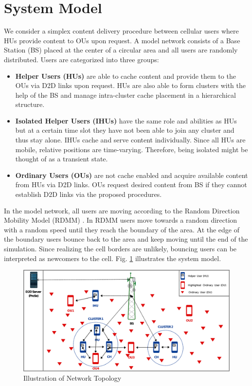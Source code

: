\documentclass[10pt,a4paper,twocolumn]{article}
\begin{document}
\section{System Model}
\label{sec:sec2}
We consider a simplex content delivery procedure between cellular users where HUs provide content to OUs upon request.  A model network consists of a Base Station (BS) placed at the center of a circular area and all users are randomly distributed. Users are categorized into three groups: 

\begin{itemize}
	\item \textbf{Helper Users (HUs)} are able to cache content and provide them to the OUs via D2D links upon request. HUs are also able to form clusters with the help of the BS and manage intra-cluster cache placement in a hierarchical structure.  
	
	\item \textbf{Isolated Helper Users (IHUs)} have the same role and abilities as HUs but at a certain time slot they have not been able to join any cluster and thus stay alone. IHUs cache and serve content individually. Since all HUs are mobile, relative positions are time-varying. Therefore, being isolated might be thought of as a transient state.
	
	\item \textbf{Ordinary Users (OUs)} are not cache enabled and acquire available content from HUs via D2D links. OUs request desired content from BS if they cannot establish D2D links via the proposed procedures.
\end{itemize}

In the model network, all users are moving according to the Random Direction Mobility Model (RDMM) \cite{Waqas2020Mobility}. In RDMM users move towards a random direction with a random speed until they reach the boundary of the area. At the edge of the boundary users bounce back to the area and keep moving until the end of the simulation. Since realizing the cell borders are unlikely, bouncing users can be interpreted as newcomers to the cell. Fig. \ref{fig:topology} illustrates the system model.

\begin{figure}[htb]
	\centering
	\includegraphics[width=\columnwidth]{topology.eps}
	\caption{Illustration of Network Topology}
	\label{fig:topology}
\end{figure}
\end{document}
